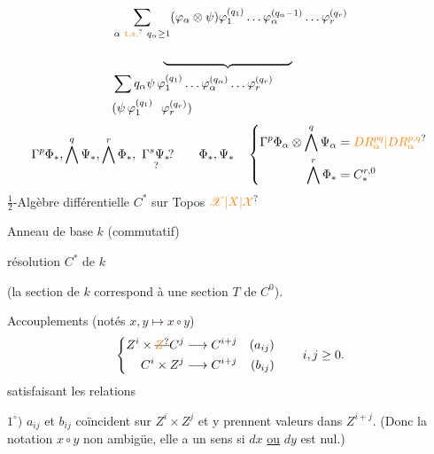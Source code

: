 \[
 \begin{aligned}
 &\sum_{\alpha\ \unsure{\mathrm{t.s.}}\ q_\alpha\geq1}
 (\varphi_\alpha\otimes\psi)\varphi_1^{(q_1)}\ldots
 \varphi_\alpha^{(q_\alpha-1)}\ldots\varphi_r^{(q_r)}\\
 &\hspace{4em}\underbrace{\phantom{\varphi_1^{(q_1)}\ldots
 \varphi_\alpha^{(q_\alpha-1)}\ldots\varphi_r^{(q_r)}}}\\
 &\sum q_\alpha\psi\,\varphi_1^{(q_1)}\ldots\varphi_\alpha^{(q_\alpha)}\ldots\varphi_r^{(q_r)}\\
 &(\psi\,\varphi_1^{(q_1)}\ \ \varphi_r^{(q_r)})
 \end{aligned}
\]
\[
 \Gamma^p\Phi_*,\bigwedge^q\Psi_*,\bigwedge^r\Phi_*,
 \ \underset{\text{?}}{\Gamma^s\Psi_*}\!?
 \qquad \Phi_*,\Psi_*\quad
 \left\{\begin{aligned}
 \Gamma^p\Phi_\alpha\otimes\bigwedge^q\Psi_\alpha&=
 \unsure{DR^{pq}_\alpha|DR^{p,q}_\alpha}\\
 \bigwedge^r\Phi_*&=C_*^{r,0}
 \end{aligned}\right.
\]
\(\tfrac12\)-Algèbre différentielle \(C^*\) sur Topos \(\unsure{\mathscr X|X|\mathcal X}\)

Anneau de base \(k\) (commutatif)

résolution \(C^*\) de \(k\)

(la section  de \(k\) correspond à une section \(T\) de \(C^0\)).

Accouplements  (notés \(x,y\longmapsto x\circ y\))
\[
 \left\{\begin{aligned}
 Z^i\times\deleted{\unsure{Z}}C^j&\longrightarrow C^{i+j} &(a_{ij})\\
 C^i\times Z^j&\longrightarrow C^{i+j} &(b_{ij})
 \end{aligned}\right.\qquad i,j\geq0.
\]
satisfaisant les relations

\(1^\circ)\) \(a_{ij}\) et \(b_{ij}\) coïncident sur \(Z^i\times Z^j\) et y prennent valeurs dans \(Z^{i+j}\). (Donc la notation  \(x\circ y\) non ambigüe, elle a un sens si \(dx\) \uline{ou} \(dy\) est nul.)

